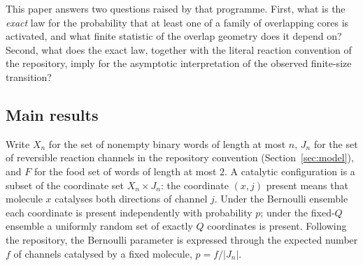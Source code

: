\documentclass[11pt,a4paper]{article}
\theoremstyle{plain}
\theoremstyle{definition}
\theoremstyle{remark}
\begin{document}
This paper answers two questions raised by that programme. First, what is the \emph{exact} law for the probability that at least one of a family of overlapping cores is activated, and what finite statistic of the overlap geometry does it depend on? Second, what does the exact law, together with the literal reaction convention of the repository, imply for the asymptotic interpretation of the observed finite-size transition?

\subsection*{Main results}

Write $X_n$ for the set of nonempty binary words of length at most $n$, $J_n$ for the set of reversible reaction channels in the repository convention (Section~\ref{sec:model}), and $F$ for the food set of words of length at most $2$. A catalytic configuration is a subset of the coordinate set $X_n\times J_n$: the coordinate $(x,j)$ present means that molecule $x$ catalyses both directions of channel $j$. Under the Bernoulli ensemble each coordinate is present independently with probability $p$; under the fixed-$Q$ ensemble a uniformly random set of exactly $Q$ coordinates is present. Following the repository, the Bernoulli parameter is expressed through the expected number $f$ of channels catalysed by a fixed molecule, $p=f/|J_n|$.
\end{document}
